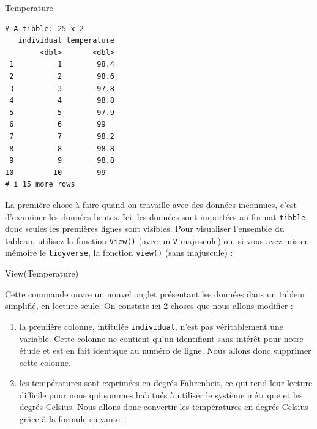 \documentclass[
  french,
  a4paper,
  DIV=11,
  numbers=noendperiod,
  oneside]{scrreprt}
\newenvironment{Shaded}{}{}
\newcommand{\FunctionTok}[1]{\textcolor[rgb]{0.44,0.26,0.76}{#1}}
\newcommand{\NormalTok}[1]{\textcolor[rgb]{0.14,0.16,0.18}{#1}}
\providecommand{\tightlist}{%
  \setlength{\itemsep}{0pt}\setlength{\parskip}{0pt}}
\begin{document}
\begin{Shaded}
\begin{Highlighting}[]
\NormalTok{Temperature}
\end{Highlighting}
\end{Shaded}

\begin{verbatim}
# A tibble: 25 x 2
   individual temperature
        <dbl>       <dbl>
 1          1        98.4
 2          2        98.6
 3          3        97.8
 4          4        98.8
 5          5        97.9
 6          6        99  
 7          7        98.2
 8          8        98.8
 9          9        98.8
10         10        99  
# i 15 more rows
\end{verbatim}

La première chose à faire quand on travaille avec des données inconnues,
c'est d'examiner les données brutes. Ici, les données sont importées au
format \texttt{tibble}, donc seules les premières lignes sont visibles.
Pour visualiser l'ensemble du tableau, utilisez la fonction
\texttt{View()} (avec un \texttt{V} majuscule) ou, si vous avez mis en
mémoire le \texttt{tidyverse}, la fonction \texttt{view()} (sans
majuscule) :

\begin{Shaded}
\begin{Highlighting}[]
\FunctionTok{View}\NormalTok{(Temperature)}
\end{Highlighting}
\end{Shaded}

Cette commande ouvre un nouvel onglet présentant les données dans un
tableur simplifié, en lecture seule. On constate ici 2 choses que nous
allons modifier :

\begin{enumerate}
\def\labelenumi{\arabic{enumi}.}
\tightlist
\item
  la première colonne, intitulée \texttt{individual}, n'est pas
  véritablement une variable. Cette colonne ne contient qu'un
  identifiant sans intérêt pour notre étude et est en fait identique au
  numéro de ligne. Nous allons donc supprimer cette colonne.
\item
  les températures sont exprimées en degrés Fahrenheit, ce qui rend leur
  lecture difficile pour nous qui sommes habitués à utiliser le système
  métrique et les degrés Celsius. Nous allons donc convertir les
  températures en degrés Celsius grâce à la formule suivante :
\end{enumerate}
\end{document}
